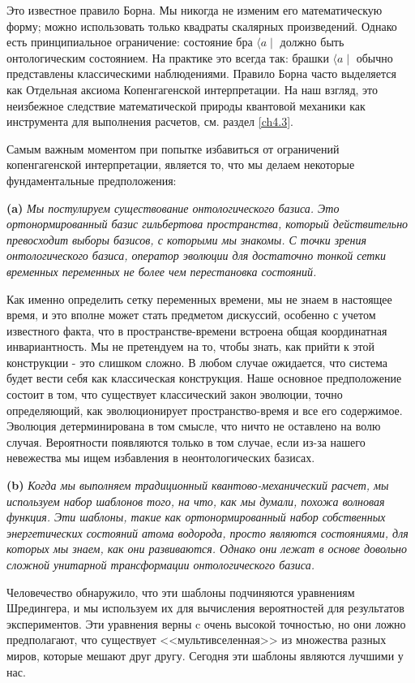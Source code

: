 \documentclass[main.tex]{subfiles}
\begin{document}
Это известное правило Борна. Мы никогда не изменим его математическую форму; можно использовать только квадраты скалярных произведений. Однако есть принципиальное ограничение: состояние бра $\langle a\mid$ должно быть онтологическим состоянием. На практике это всегда так: брашки $\langle a\mid$ обычно представлены классическими наблюдениями. Правило Борна часто выделяется как Отдельная аксиома Копенгагенской интерпретации. На наш взгляд, это неизбежное следствие математической природы квантовой механики как инструмента для выполнения расчетов, см. раздел \ref{ch4.3}.

Самым важным моментом при попытке избавиться от ограничений копенгагенской интерпретации, является то, что мы делаем некоторые фундаментальные предположения:

\textbf{(a)} {\it Мы постулируем существование онтологического базиса. Это ортонормированный базис гильбертова пространства, который действительно превосходит выборы базисов, с которыми мы знакомы. С точки зрения онтологического базиса, оператор эволюции для достаточно тонкой сетки временных переменных не более чем перестановка состояний.}

Как именно определить сетку переменных времени, мы не знаем в настоящее время, и это вполне может стать предметом дискуссий, особенно с учетом известного факта, что в пространстве-времени встроена общая координатная инвариантность. Мы не претендуем на то, чтобы знать, как прийти к этой конструкции - это слишком сложно. В любом случае ожидается, что система будет вести себя как классическая конструкция. Наше основное предположение состоит в том, что существует классический закон эволюции, точно определяющий, как эволюционирует пространство-время и все его содержимое. Эволюция детерминирована в том смысле, что ничто не оставлено на волю случая. Вероятности появляются только в том случае, если из-за нашего невежества мы ищем избавления в неонтологических базисах.

\textbf{(b)} {\it Когда мы выполняем традиционный квантово-механический расчет, мы используем набор шаблонов того, на что, как мы думали, похожа волновая функция. Эти шаблоны, такие как ортонормированный набор собственных энергетических состояний атома водорода, просто являются состояниями, для которых мы знаем, как они развиваются. Однако они лежат в основе довольно сложной унитарной трансформации онтологического базиса.}

Человечество обнаружило, что эти шаблоны подчиняются уравнениям Шредингера, и мы используем их для вычисления вероятностей для результатов экспериментов. Эти уравнения верны c очень высокой точностью, но они ложно предполагают, что существует <<мультивселенная>> из множества разных миров, которые мешают друг другу. Сегодня эти шаблоны являются лучшими у нас.
\end{document}
